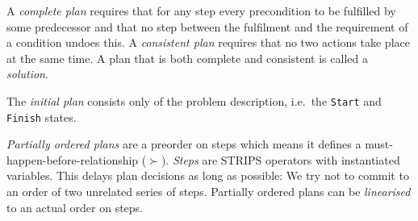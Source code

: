 \documentclass[english]{panikzettel}
\begin{document}
A \emph{complete plan} requires that for any step every precondition to be fulfilled by some predecessor and that no step between the fulfilment and the requirement of a condition undoes this.
A \emph{consistent plan} requires that no two actions take place at the same time.
A plan that is both complete and consistent is called a \emph{solution}.

The \emph{initial plan} consists only of the problem description, i.e.\ the \texttt{Start} and \texttt{Finish} states.

\emph{Partially ordered plans} are a preorder on steps which means it defines a must-happen-before-relationship ($\succ$).
\emph{Steps} are STRIPS operators with instantiated variables.
This delays plan decisions as long as possible: We try not to commit to an order of two unrelated series of steps.
Partially ordered plans can be \emph{linearised} to an actual order on steps.
\end{document}
